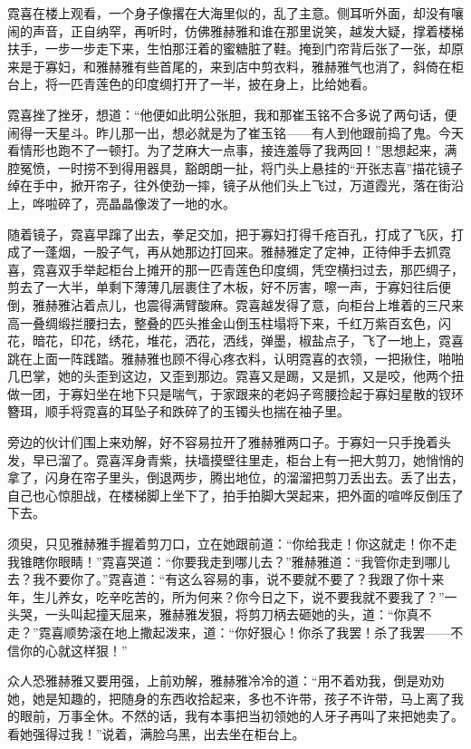 \par 霓喜在楼上观看，一个身子像撂在大海里似的，乱了主意。侧耳听外面，却没有嚷闹的声音，正自纳罕，再听时，仿佛雅赫雅和谁在那里说笑，越发大疑，撑着楼梯扶手，一步一步走下来，生怕那汪着的蜜糖脏了鞋。掩到门帘背后张了一张，却原来是于寡妇，和雅赫雅有些首尾的，来到店中剪衣料，雅赫雅气也消了，斜倚在柜台上，将一匹青莲色的印度绸打开了一半，披在身上，比给她看。
\par 霓喜挫了挫牙，想道：“他便如此明公张胆，我和那崔玉铭不合多说了两句话，便闹得一天星斗。昨儿那一出，想必就是为了崔玉铭——有人到他跟前捣了鬼。今天看情形也跑不了一顿打。为了芝麻大一点事，接连羞辱了我两回！”思想起来，满腔冤愤，一时捞不到得用器具，豁朗朗一扯，将门头上悬挂的“开张志喜”描花镜子绰在手中，掀开帘子，往外使劲一摔，镜子从他们头上飞过，万道霞光，落在街沿上，哗啦碎了，亮晶晶像泼了一地的水。
\par 随着镜子，霓喜早蹿了出去，拳足交加，把于寡妇打得千疮百孔，打成了飞灰，打成了一蓬烟，一股子气，再从她那边打回来。雅赫雅定了定神，正待伸手去抓霓喜，霓喜双手举起柜台上摊开的那一匹青莲色印度绸，凭空横扫过去，那匹绸子，剪去了一大半，单剩下薄薄几层裹住了木板，好不厉害，嚓一声，于寡妇往后便倒，雅赫雅沾着点儿，也震得满臂酸麻。霓喜越发得了意，向柜台上堆着的三尺来高一叠绸缎拦腰扫去，整叠的匹头推金山倒玉柱塌将下来，千红万紫百玄色，闪花，暗花，印花，绣花，堆花，洒花，洒线，弹墨，椒盐点子，飞了一地上，霓喜跳在上面一阵践踏。雅赫雅也顾不得心疼衣料，认明霓喜的衣领，一把揪住，啪啪几巴掌，她的头歪到这边，又歪到那边。霓喜又是踢，又是抓，又是咬，他两个扭做一团，于寡妇坐在地下只是喘气，于家跟来的老妈子弯腰捡起于寡妇星散的钗环簪珥，顺手将霓喜的耳坠子和跌碎了的玉镯头也揣在袖子里。
\par 旁边的伙计们围上来劝解，好不容易拉开了雅赫雅两口子。于寡妇一只手挽着头发，早已溜了。霓喜浑身青紫，扶墙摸壁往里走，柜台上有一把大剪刀，她悄悄的拿了，闪身在帘子里头，倒退两步，腾出地位，的溜溜把剪刀丢出去。丢了出去，自己也心惊胆战，在楼梯脚上坐下了，拍手拍脚大哭起来，把外面的喧哗反倒压了下去。
\par 须臾，只见雅赫雅手握着剪刀口，立在她跟前道：“你给我走！你这就走！你不走我锥瞎你眼睛！”霓喜哭道：“你要我走到哪儿去？”雅赫雅道：“我管你走到哪儿去？我不要你了。”霓喜道：“有这么容易的事，说不要就不要了？我跟了你十来年，生儿养女，吃辛吃苦的，所为何来？你今日之下，说不要我就不要我了？”一头哭，一头叫起撞天屈来，雅赫雅发狠，将剪刀柄去砸她的头，道：“你真不走？”霓喜顺势滚在地上撒起泼来，道：“你好狠心！你杀了我罢！杀了我罢——不信你的心就这样狠！”
\par 众人恐雅赫雅又要用强，上前劝解，雅赫雅冷冷的道：“用不着劝我，倒是劝劝她，她是知趣的，把随身的东西收拾起来，多也不许带，孩子不许带，马上离了我的眼前，万事全休。不然的话，我有本事把当初领她的人牙子再叫了来把她卖了。看她强得过我！”说着，满脸乌黑，出去坐在柜台上。
